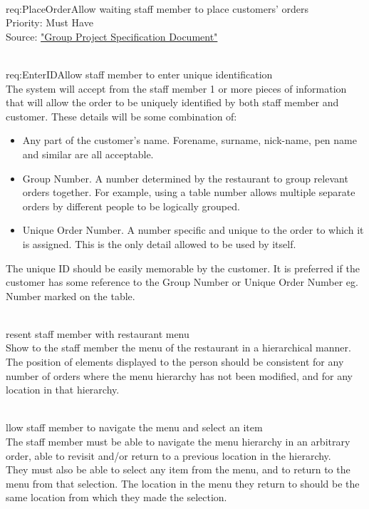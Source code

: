 \documentclass[11pt, a4paper]{report}
\def\itempar#1\\{\item \textbf{#1}\\} %
\begin{document}
\begin{enumerate}[label=F-UR-\arabic*, series=functional]

\itempar \label{req:PlaceOrder}Allow waiting staff member to place customers' orders\\
Priority: Must Have\\
Source: \href{http://www.macs.hw.ac.uk/~rpp6/teaching/GroupProject/docs/project/GroupProjectSpec2017.pdf}{"Group Project Specification Document"}

\begin{enumerate}[label*=.\arabic*]
\itempar \label{req:EnterID}Allow staff member to enter unique identification\\
The system will accept from the staff member 1 or more pieces of information that will allow the order to be uniquely identified by both staff member and customer. These details will be some combination of:
\begin{itemize}
\item Any part of the customer's name. Forename, surname, nick-name, pen name and similar are all acceptable.
\item Group Number. A number determined by the restaurant to group relevant orders together. For example, using a table number allows multiple separate orders by different people to be logically grouped.
\item Unique Order Number. A number specific and unique to the order to which it is assigned. This is the only detail allowed to be used by itself.
\end{itemize}
The unique ID should be easily memorable by the customer. It is preferred if the customer has some reference to the Group Number or Unique Order Number eg. Number marked on the table.

\itempar Present staff member with restaurant menu\\
Show to the staff member the menu of the restaurant in a hierarchical manner.\\
The position of elements displayed to the person should be consistent for any number of orders where the menu hierarchy has not been modified, and for any location in that hierarchy.

\itempar Allow staff member to navigate the menu and select an item\\
The staff member must be able to navigate the menu hierarchy in an arbitrary order, able to revisit and/or return to a previous location in the hierarchy.\\
They must also be able to select any item from the menu, and to return to the menu from that selection. The location in the menu they return to should be the same location from which they made the selection.


\end{enumerate}
\end{enumerate}
\end{document}

